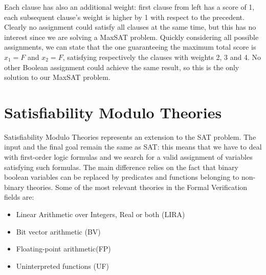Each clause has also an additional weight: first clause from left has a score of 1, each subsequent clause's weight is higher by 1 with respect to the precedent. Clearly no assignment could satisfy all clauses at the same time, but this has no interest since we are solving a MaxSAT problem. Quickly considering all possible assignments, we can state that the one guaranteeing the maximum total score is $x_1 = F$ and $x_2 = F$, satisfying respectively the clauses with weights 2, 3 and 4. No other Boolean assignment could achieve the same result, so this is the only solution to our MaxSAT problem.

\section{Satisfiability Modulo Theories}

Satisfiability Modulo Theories represents an extension to the SAT problem. The input and the final goal remain the same as SAT: this means that we have to deal with first-order logic formulas and we search for a valid assignment of variables satisfying such formulas. The main difference relies on the fact that binary boolean variables can be replaced by predicates and functions belonging to non-binary theories. Some of the most relevant theories in the Formal Verification fields are:

\begin{itemize}
    \item Linear Arithmetic over Integers, Real or both (LIRA)
    \item Bit vector arithmetic (BV)
    \item Floating-point arithmetic(FP)
    \item Uninterpreted functions (UF)
\end{itemize}

